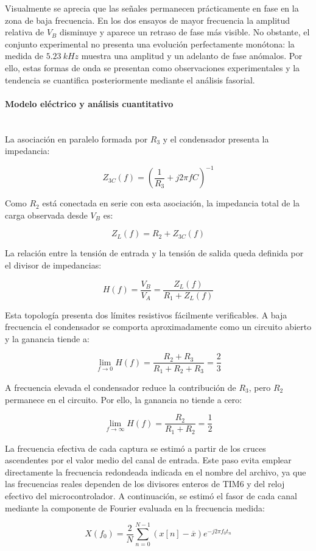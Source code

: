 \documentclass[11pt,a4paper]{article}
\newcommand{\myparagraph}[1]{\paragraph{#1}\mbox{}\\}
\begin{document}


Visualmente se aprecia que las señales permanecen prácticamente en fase en la zona de baja frecuencia. En los dos ensayos de mayor frecuencia la amplitud relativa de \(V_B\) disminuye y aparece un retraso de fase más visible. No obstante, el conjunto experimental no presenta una evolución perfectamente monótona: la medida de \(5.23~kHz\) muestra una amplitud y un adelanto de fase anómalos. Por ello, estas formas de onda se presentan como observaciones experimentales y la tendencia se cuantifica posteriormente mediante el análisis fasorial.

\myparagraph{Modelo eléctrico y análisis cuantitativo}

La asociación en paralelo formada por \(R_3\) y el condensador presenta la impedancia:

\[
Z_{3C}(f)=\left(\frac{1}{R_3}+j2\pi f C\right)^{-1}
\]

Como \(R_2\) está conectada en serie con esta asociación, la impedancia total de la carga observada desde \(V_B\) es:

\[
Z_L(f)=R_2+Z_{3C}(f)
\]

La relación entre la tensión de entrada y la tensión de salida queda definida por el divisor de impedancias:

\[
H(f)=\frac{V_B}{V_A}=\frac{Z_L(f)}{R_1+Z_L(f)}
\]

Esta topología presenta dos límites resistivos fácilmente verificables. A baja frecuencia el condensador se comporta aproximadamente como un circuito abierto y la ganancia tiende a:

\[
\lim_{f\to 0} H(f)=
\frac{R_2+R_3}{R_1+R_2+R_3}
=\frac{2}{3}
\]

A frecuencia elevada el condensador reduce la contribución de \(R_3\), pero \(R_2\) permanece en el circuito. Por ello, la ganancia no tiende a cero:

\[
\lim_{f\to \infty} H(f)=
\frac{R_2}{R_1+R_2}
=\frac{1}{2}
\]

La frecuencia efectiva de cada captura se estimó a partir de los cruces ascendentes por el valor medio del canal de entrada. Este paso evita emplear directamente la frecuencia redondeada indicada en el nombre del archivo, ya que las frecuencias reales dependen de los divisores enteros de TIM6 y del reloj efectivo del microcontrolador. A continuación, se estimó el fasor de cada canal mediante la componente de Fourier evaluada en la frecuencia medida:

\[
X(f_0)=\frac{2}{N}\sum_{n=0}^{N-1}\left(x[n]-\overline{x}\right)e^{-j2\pi f_0t_n}
\]
\end{document}
